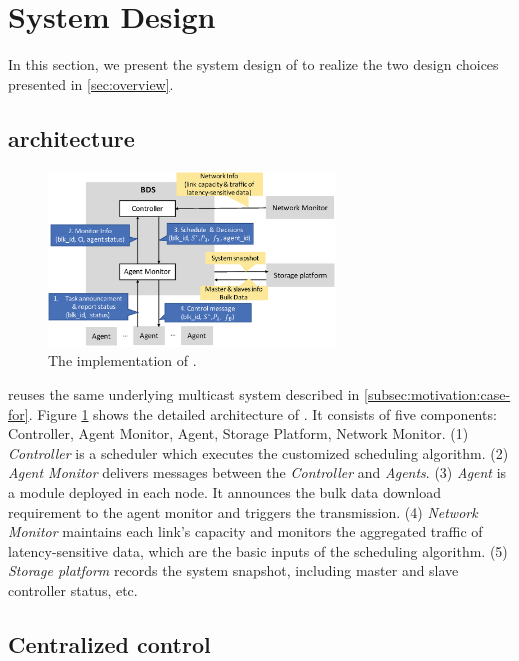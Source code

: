 \section{System Design}
\label{sec:system}

In this section, we present the system design of \name to realize the two design choices presented in \Section\ref{sec:overview}.

\subsection{\name architecture}
\label{subsec:system:architecture}

\begin{figure}[t]
  \centering
  \includegraphics[width=3in]{images/implementation.eps}
  \caption{The implementation of \name.}
  \label{fig:implementation}
\end{figure}

\name reuses the same underlying multicast system described in \Section\ref{subsec:motivation:case-for}. Figure \ref{fig:implementation} shows the detailed architecture of \name. It consists of five components: Controller, Agent Monitor, Agent, Storage Platform, Network Monitor. (1) \emph{Controller} is a scheduler which executes the customized scheduling algorithm. (2) \emph{Agent Monitor} delivers messages between the \emph{Controller} and \emph{Agents}. (3) \emph{Agent} is a module deployed in each node. It announces the bulk data download requirement to the agent monitor and triggers the transmission. (4) \emph{Network Monitor} maintains each link's capacity and monitors the aggregated traffic of latency-sensitive data, which are the basic inputs of the scheduling algorithm. (5) \emph{Storage platform} records the system snapshot, including master and slave controller status, etc.

\subsection{Centralized control}
\label{subsec:system:centralized}

